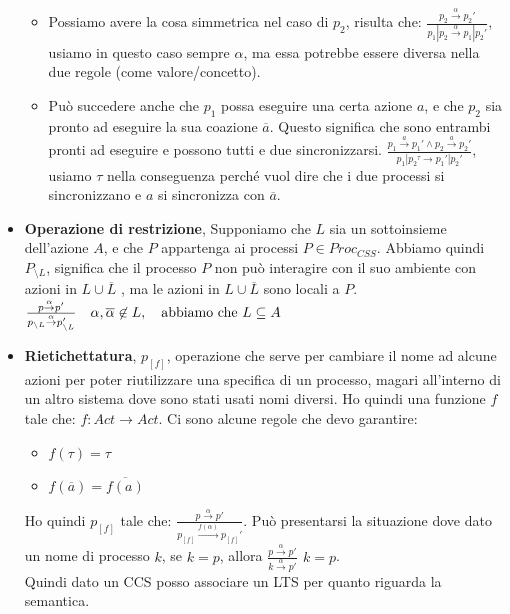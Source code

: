 \begin{itemize}
\begin{itemize}
        \item Possiamo avere la cosa simmetrica nel caso di $p_2$, risulta che: $\frac{p_2 \stackrel{\alpha}\to p_2'}{p_1|p_2 \stackrel{\alpha}\to p_1|p_2'}$, usiamo in questo caso sempre $\alpha$, ma essa potrebbe essere diversa nella due regole (come valore/concetto).
        \item Può succedere anche che $p_1$ possa eseguire una certa azione $a$, e che $p_2$ sia pronto ad eseguire la sua coazione $\overline{a}$. Questo significa che sono entrambi pronti ad eseguire e possono tutti e due sincronizzarsi.
        $\frac{p_1 \stackrel{a}\to p_1' \land p_2 \stackrel{a}\to p_2'}{p_1|p_2 \stackrel \tau\ \to p_1'|p_2'}$, usiamo $\tau$ nella conseguenza perché vuol dire che i due processi si sincronizzano e $a$ si sincronizza con $\overline{a}$.
    \end{itemize}
    \item \textbf{Operazione di restrizione}, Supponiamo che $L$ sia un sottoinsieme dell'azione $A$, e che $P$ appartenga ai processi $P \in Proc_{CSS}$. Abbiamo quindi $P_{\setminus L}$, significa che  il processo $P$ non può interagire con il suo ambiente con azioni in $L \cup \overline{L}$ , ma le azioni in $L \cup \overline{L}$ sono locali a $P$.
    $\frac{p\stackrel{\alpha}{\to}p'}{p_{\setminus L} \stackrel{\alpha}{\to}p'_{\setminus L}} \quad \alpha,\overline{\alpha}\not\in L,\quad \textnormal{abbiamo che }L\subseteq A$
    
    \item \textbf{Rietichettatura}, $p_{[f]}$, operazione che serve per cambiare il nome ad alcune azioni per poter riutilizzare una specifica di un processo, magari all’interno di un altro sistema dove sono stati usati nomi diversi. Ho quindi una funzione $f$ tale che: $f:Act \to Act$. Ci sono alcune regole che devo garantire:
    \begin{itemize}
        \item $f(\tau) = \tau$
        \item $f(\overline{a}) = \overline{f(a)}$
    \end{itemize}
    Ho quindi $p_{[f]}$ tale che:  $\frac{p \stackrel  {\alpha} \to p'}{p_{[f]} \stackrel{f(\alpha)} \longrightarrow p_{[f]}' }$. Può presentarsi la situazione dove dato un nome di processo $k$, se $k = p$, allora $\frac{p \stackrel  {\alpha} \to p'}{k \stackrel  {\alpha} \to p'} \, \ k = p$. \\
    Quindi dato un CCS posso associare un LTS per quanto riguarda la semantica.
\end{itemize}